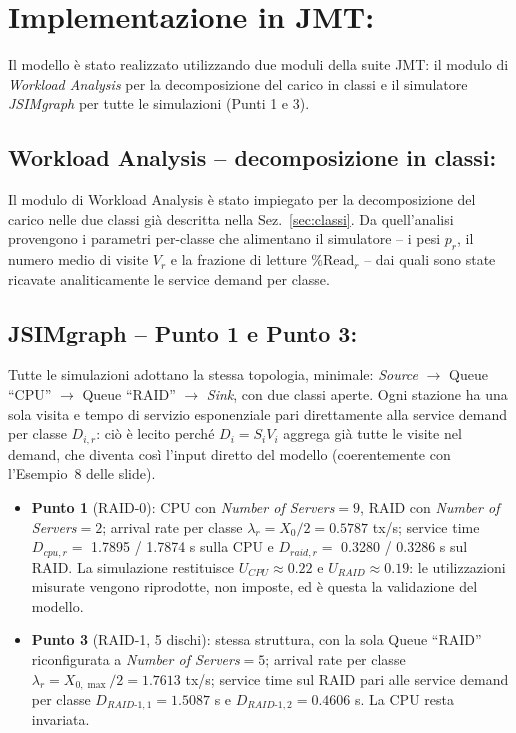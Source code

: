 \documentclass[11pt,a4paper]{article}
\begin{document}
\section{Implementazione in JMT:}

Il modello è stato realizzato utilizzando due moduli della suite JMT: il modulo di
\emph{Workload Analysis} per la decomposizione del carico in classi e il simulatore
\emph{JSIMgraph} per tutte le simulazioni (Punti 1 e 3).

\subsection{Workload Analysis -- decomposizione in classi:}
Il modulo di Workload Analysis è stato impiegato per la decomposizione del carico nelle due classi
già descritta nella Sez.~\ref{sec:classi}. Da quell'analisi provengono i parametri per-classe che
alimentano il simulatore -- i pesi $p_r$, il numero medio di visite $V_r$ e la frazione di letture
$\%\text{Read}_r$ -- dai quali sono state ricavate analiticamente le service demand per classe.

\subsection{JSIMgraph -- Punto 1 e Punto 3:}
\label{sec:jsimgraph}
Tutte le simulazioni adottano la stessa topologia, minimale: \emph{Source} $\to$ Queue ``CPU''
$\to$ Queue ``RAID'' $\to$ \emph{Sink}, con due classi aperte. Ogni stazione ha una sola visita e
tempo di servizio esponenziale pari direttamente alla service demand per classe $D_{i,r}$: ciò è
lecito perché $D_i = S_i V_i$ aggrega già tutte le visite nel demand, che diventa così l'input
diretto del modello (coerentemente con l'Esempio~8 delle slide).

\begin{itemize}
\item \textbf{Punto 1} (RAID-0): CPU con \emph{Number of Servers}$=9$, RAID con
\emph{Number of Servers}$=2$; arrival rate per classe $\lambda_r = X_0/2 = 0.5787$ tx/s; service
time $D_{cpu,r}=$ 1.7895 / 1.7874 s sulla CPU e $D_{raid,r}=$ 0.3280 / 0.3286 s sul RAID. La
simulazione restituisce $U_{CPU}\approx 0.22$ e $U_{RAID}\approx 0.19$: le utilizzazioni misurate
vengono riprodotte, non imposte, ed è questa la validazione del modello.
\item \textbf{Punto 3} (RAID-1, 5 dischi): stessa struttura, con la sola Queue ``RAID''
riconfigurata a \emph{Number of Servers}$=5$; arrival rate per classe
$\lambda_r = X_{0,\max}/2 = 1.7613$ tx/s; service time sul RAID pari alle service demand per classe
$D_{RAID\text{-}1,1}=1.5087$ s e $D_{RAID\text{-}1,2}=0.4606$ s. La CPU resta invariata.
\end{itemize}
\end{document}
